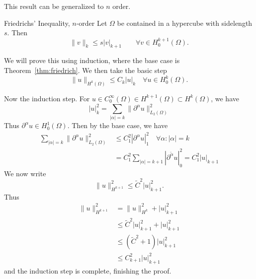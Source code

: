 This result can be generalized to $n$ order. 

\begin{kor}{Friedrichs' Inequality, $n$-order}
    Let $\Omega$ be contained in a hypercube with sidelength $s$. Then 
\begin{equation*}
    \| v \|_{k} \leq s |v|_{k+1} \quad \quad \forall v \in H_0^{k+1}(\Omega).
\end{equation*}\label{cor:friedrich_n}
\vspace{-8mm}
\end{kor}
\begin{bev}
We will prove this using induction, where the base case is Theorem~\ref{thm:friedrich}.
We then take the basic step
\begin{equation*}
    \|u\|_{ H^k (\Omega)} \leq C_k |u|_k \quad \forall u \in H_0^k (\Omega).
\end{equation*}

Now the induction step. For $u\in C^{\infty}_0(\Omega)\in H^{k+1}(\Omega)\subset H^k(\Omega)$, we have
\begin{equation}
    |u|^2_k = \sum_{|\alpha| = k} \|\partial^\alpha u\|_{L_2(\Omega)}^2
\end{equation}
Thus $\partial^\alpha u \in H^1_0(\Omega)$. Then by the base case, we have
\begin{equation}
    \begin{split}
        \sum_{|\alpha|=k} \|\partial^\alpha u\|^2_{L_2(\Omega)} &\leq C_1^2 |\partial^\alpha u|_1^2 \quad \forall \alpha : |\alpha|=k \\
        &= C^2_1 \sum_{|\alpha|=k+1} |\partial^{\tilde{\alpha}} u |^2_0 = C_1^2 |u|_{k+1}
    \end{split}
\end{equation}  
We now write
\begin{equation}
    \|u\|^2_{H^{k+1}} \leq \tilde{C}^2 |u|^2_{k+1}.
\end{equation}
Thus
\begin{align*}
    \|u\|^2_{H^{k+1}} &=\|u\|^2_{H^k} + |u|^2_{k+1} \\
    &\leq \tilde{C}^2|u|^2_{k+1} + |u|^2_{k+1} \\
    &\leq (\tilde{C}^2 + 1)|u|^2_{k+1} \\
    &\leq C_{k+1}^2 |u|^2_{k+1}
\end{align*}
and the induction step is complete, finishing the proof.
\end{bev}